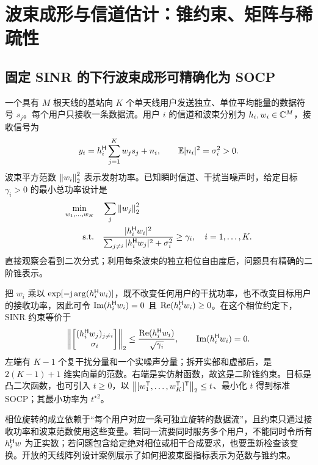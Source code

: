 \chapter{波束成形与信道估计：锥约束、矩阵与稀疏性}
\label{chap:beam-estimation}

\section{固定 SINR 的下行波束成形可精确化为 SOCP}
一个具有 $M$ 根天线的基站向 $K$ 个单天线用户发送独立、单位平均能量的数据符号 $s_j$。每个用户只接收一条数据流。用户 $i$ 的信道和波束分别为 $h_i,w_i\in\mathbb C^M$，接收信号为
\begin{equation}
 y_i=h_i^\mathsf H\sum_{j=1}^K w_js_j+n_i,
 \qquad \mathbb E|n_i|^2=\sigma_i^2>0.
\end{equation}
波束平方范数 $\left\lVert w_i\right\rVert_2^2$ 表示发射功率。已知瞬时信道、干扰当噪声时，给定目标 $\gamma_i>0$ 的最小总功率设计是
\begin{equation}
 \begin{aligned}
 \min_{w_1,\ldots,w_K}\quad&\sum_j\left\lVert w_j\right\rVert_2^2\\
 \text{s.t.}\quad&
 \frac{|h_i^\mathsf H w_i|^2}{\sum_{j\ne i}|h_i^\mathsf H w_j|^2+\sigma_i^2}\geq\gamma_i,
 \quad i=1,\ldots,K.
 \end{aligned}
 \label{eq:unicast-original}
\end{equation}
直接观察会看到二次分式；利用每条波束的独立相位自由度后，问题具有精确的二阶锥表示。

把 $w_i$ 乘以 $\exp[-\mathrm j\arg(h_i^\mathsf H w_i)]$，既不改变任何用户的干扰功率，也不改变目标用户的接收功率，因此可令
$\operatorname{Im}(h_i^\mathsf H w_i)=0$ 且 $\operatorname{Re}(h_i^\mathsf H w_i)\geq0$。在这个相位约定下，SINR 约束等价于
\begin{equation}
 \left\|\begin{bmatrix}(h_i^\mathsf H w_j)_{j\ne i}\\\sigma_i\end{bmatrix}\right\|_2
 \leq\frac{\operatorname{Re}(h_i^\mathsf H w_i)}{\sqrt{\gamma_i}},
 \qquad \operatorname{Im}(h_i^\mathsf H w_i)=0.
 \label{eq:beam-soc}
\end{equation}
左端有 $K-1$ 个复干扰分量和一个实噪声分量；拆开实部和虚部后，是 $2(K-1)+1$ 维实向量的范数。右端是实仿射函数，故这是二阶锥约束。目标是凸二次函数，也可引入 $t\geq0$，以 $\left\lVert [w_1^\mathsf T,\ldots,w_K^\mathsf T]^\mathsf T\right\rVert_2\leq t$、最小化 $t$ 得到标准 SOCP；其最小功率为 $t^{\star2}$。

相位旋转的成立依赖于“每个用户对应一条可独立旋转的数据流”，且约束只通过接收功率和波束范数使用这些变量。若同一流要同时服务多个用户，不能同时令所有 $h_i^\mathsf H w$ 为正实数；若问题包含给定绝对相位或相干合成要求，也要重新检查该变换。开放的天线阵列设计案例展示了如何把波束图指标表示为范数与锥约束\cite{cvxexamples}。

